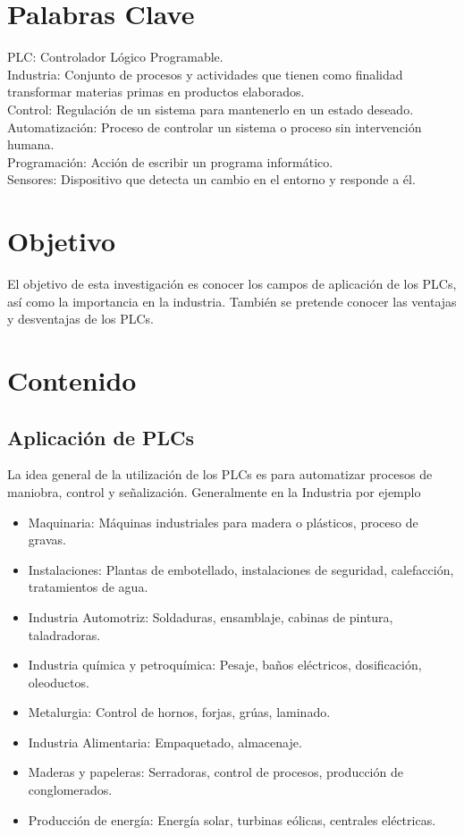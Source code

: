 \documentclass[12pt]{report}
\begin{document}
\tableofcontents
\newpage

\chapter*{Palabras Clave}
PLC: Controlador Lógico Programable.\\
Industria: Conjunto de procesos y actividades que tienen como finalidad transformar materias primas en productos elaborados.\\
Control: Regulación de un sistema para mantenerlo en un estado deseado.\\
Automatización: Proceso de controlar un sistema o proceso sin intervención humana.\\
Programación: Acción de escribir un programa informático.\\
Sensores: Dispositivo que detecta un cambio en el entorno y responde a él.\\

\newpage


\chapter*{Objetivo}
El objetivo de esta investigación es conocer los campos de aplicación de los PLCs, así como la importancia en la industria. También se pretende conocer las ventajas y desventajas de los PLCs.
\newpage
\chapter{Contenido}
\section{Aplicación de PLCs}
La idea general de la utilización de los PLCs es para automatizar procesos de maniobra, control y señalización. Generalmente en la Industria por ejemplo
\begin{itemize}
\item Maquinaria: Máquinas industriales para madera o plásticos, proceso de gravas.
\item Instalaciones: Plantas de embotellado, instalaciones de seguridad, calefacción, tratamientos de agua.
\item Industria Automotriz: Soldaduras, ensamblaje, cabinas de pintura, taladradoras.
\item Industria química y petroquímica: Pesaje, baños eléctricos, dosificación, oleoductos.
\item Metalurgia: Control de hornos, forjas, grúas, laminado.
\item Industria Alimentaria: Empaquetado, almacenaje.
\item Maderas y papeleras: Serradoras, control de procesos, producción de conglomerados.
\item Producción de energía: Energía solar, turbinas eólicas, centrales eléctricas. \cite{Autycom2018}
\end{itemize}
\end{document}
